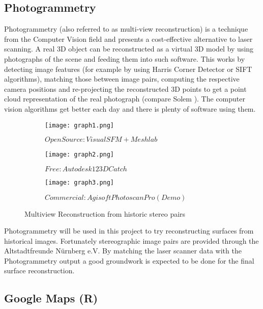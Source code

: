 \subsection{Photogrammetry}

Photogrammetry (also referred to as multi-view reconstruction) is a technique from the Computer Vision field and presents a cost-effective alternative to laser scanning. A real 3D object can be reconstructed as a virtual 3D model by using photographs of the scene and feeding them into such software. This works by detecting image features (for example by using Harris Corner Detector or SIFT algorithms), matching those between image pairs, computing the respective camera positions and re-projecting the reconstructed 3D points to get a point cloud representation of the real photograph (compare Solem \parencite[][p29]{bookProgrammingComputerVisionwithPython}).
The computer vision algorithms get better each day and there is plenty of software using them.

\begin{figure}[h]
	\centering
	\begin{subfigure}[b]{0.3\textwidth}
		\centering
		\texttt{[image: graph1.png]}
		\caption{$OpenSource: Visual SFM + Meshlab$}
		\label{fig:visualsfm meshlab}
	\end{subfigure}
	\hfill
	\begin{subfigure}[b]{0.3\textwidth}
		\centering
		\texttt{[image: graph2.png]}
		\caption{$Free: Autodesk 123D Catch$}
		\label{fig:123dcatch}
	\end{subfigure}
	\hfill
	\begin{subfigure}[b]{0.3\textwidth}
		\centering
		\texttt{[image: graph3.png]}
		\caption{$Commercial: Agisoft Photoscan Pro (Demo)$}
		\label{fig:photoscan pro}
	\end{subfigure}
	\caption{Multiview Reconstruction from historic stereo pairs}
	\label{fig:multiview reconstruction historic stereo}
\end{figure}

Photogrammetry will be used in this project to try reconstructing surfaces from historical images. Fortunately stereographic image pairs are provided through the Altstadtfreunde Nürnberg e.V. By matching the laser scanner data with the Photogrammetry output a good groundwork is expected to be done for the final surface reconstruction.

\subsection{Google Maps (R) }

